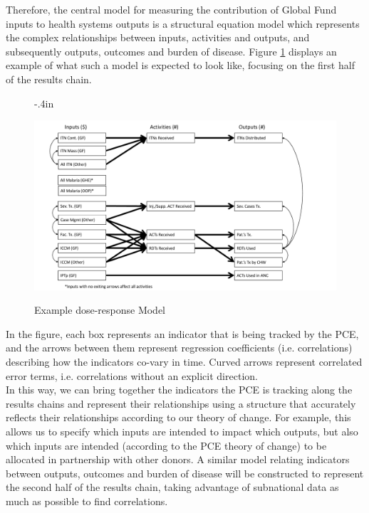 \documentclass[twocolumn]{bmcart}%
\begin{document}
Therefore, the central model for measuring the contribution of Global Fund inputs to health systems outputs is a structural equation model which represents the complex relationships between inputs, activities and outputs, and subsequently outputs, outcomes and burden of disease. Figure \ref{fig2} displays an example of what such a model is expected to look like, focusing on the first half of the results chain. \\
\begin{figure}[h]
  \advance\leftskip-.4in
  \caption{\textmd{Example dose-response Model}}
  \includegraphics[scale=.35]{SEM_Diagram_Malaria.pdf} \\
  \label{fig2}
\end{figure}

In the figure, each box represents an indicator that is being tracked by the PCE, and the arrows between them represent regression coefficients (i.e. correlations) describing how the indicators co-vary in time. Curved arrows represent correlated error terms, i.e. correlations without an explicit direction. \\

In this way, we can bring together the indicators the PCE is tracking along the results chains and represent their relationships using a structure that accurately reflects their relationships according to our theory of change. For example, this allows us to specify which inputs are intended to impact which outputs, but also which inputs are intended (according to the PCE theory of change) to be allocated in partnership with other donors. A similar model relating indicators between outputs, outcomes and burden of disease will be constructed to represent the second half of the results chain, taking advantage of subnational data as much as possible to find correlations. \\
\end{document}
